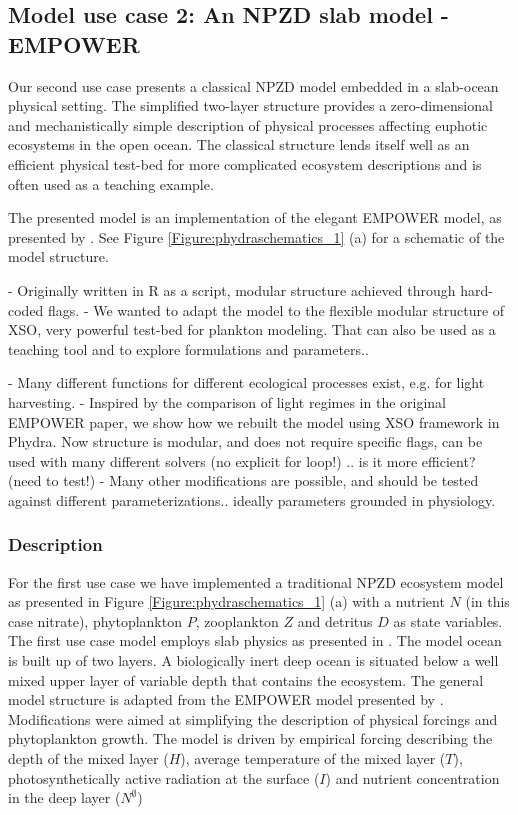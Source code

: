 \documentclass[journal abbreviation, manuscript]{copernicus}
\begin{document}
\subsection{Model use case 2: An NPZD slab model - EMPOWER}
Our second use case presents a classical NPZD model embedded in a slab-ocean physical setting. The simplified two-layer structure provides a zero-dimensional and mechanistically simple description of physical processes affecting euphotic ecosystems in the open ocean. The classical structure lends itself well as an efficient physical test-bed for more complicated ecosystem descriptions and is often used as a teaching example.

The presented model is an implementation of the elegant EMPOWER model, as presented by \citet{Anderson2015c}. 
See Figure \ref{Figure:phydraschematics_1} (a) for a schematic of the model structure.

- Originally written in R as a script, modular structure achieved through hard-coded flags.
- We wanted to adapt the model to the flexible modular structure of XSO, very powerful test-bed for plankton modeling. That can also be used as a teaching tool and to explore formulations and parameters..

- Many different functions for different ecological processes exist, e.g. for light harvesting.
- Inspired by the comparison of light regimes in the original EMPOWER paper, we show how we rebuilt the model using XSO framework in Phydra. Now structure is modular, and does not require specific flags, can be used with many different solvers (no explicit for loop!) .. is it more efficient? (need to test!)
- Many other modifications are possible, and should be tested against different parameterizations.. ideally parameters grounded in physiology.


\subsubsection{Description}
For the first use case we have implemented a traditional NPZD ecosystem model as presented in Figure \ref{Figure:phydraschematics_1} (a) with a nutrient $N$ (in this case nitrate), phytoplankton $P$, zooplankton $Z$ and detritus $D$ as state variables. The first use case model employs slab physics as presented in \citet{Evans1985ACycles}. The model ocean is built up of two layers. A biologically inert deep ocean is situated below a well mixed upper layer of variable depth that contains the ecosystem. The general model structure is adapted from the EMPOWER model presented by \citet{Anderson2015c}.
Modifications were aimed at simplifying the description of physical forcings and phytoplankton growth. The model is driven by empirical forcing describing the depth of the mixed layer ($H$), average temperature of the mixed layer ($T$), photosynthetically active radiation at the surface ($I$) and nutrient concentration in the deep layer ($N^\emptyset$) 
\end{document}
